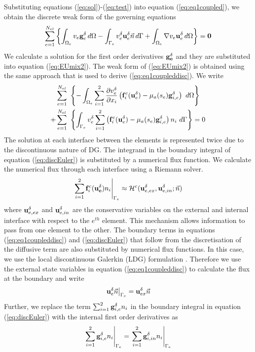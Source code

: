 \documentclass[review]{elsarticle}
\begin{document}
Substituting equations (\ref{eq:sol})-(\ref{eq:test}) into equation (\ref{eq:eq1coupled}), we obtain the discrete weak form of the governing equations
\begin{equation}\label{eq:eq1coupleddisc}
\sum_{e=1}^{N_{el}}\left\{\int_{\Omega_e}{v}_e {{{\bf g}}}^\delta_e \, d\Omega-\int_{\Gamma_e}{v}^\delta_e{\bf u}^\delta_e  \vec{n}\, d\Gamma + \int_{\Omega_e} \nabla {v}_e {\bf u}^\delta_e \, d\Omega\right\}= \bf 0
\end{equation}
We calculate a solution for the first order derivatives $\bf g_e^\delta$ and they are substituted into equation (\ref{eq:EUmix2}). The weak form of (\ref{eq:EUmix2}) is obtained using the same approach that is used to derive (\ref{eq:eq1coupleddisc}). We write
\begin{eqnarray}\label{eq:discEuler}
&\sum_{e=1}^{N_{el}}\ \left\{- \int_{\Omega_e}\sum_{i=1}^{2} \frac{\partial v_e^\delta}{\partial x_i} \left({\bf f}^c_i({\bf u}^\delta_e)-\mu_a(s_e){\bf g}_{i,e}^\delta\right)\ d{\Omega}\right\}\\ \nonumber
+&\sum_{e=1}^{N_{el}}\ \left\{ \int_{\Gamma_e} v_e^\delta\sum_{i=1}^2\left( {\bf f}^c_i({\bf u}^\delta_e)-\mu_a(s_e){\bf g}_{i,e}^\delta\right)n_i\ d\Gamma\right\}  = 0
\end{eqnarray}
The solution at each interface between the elements is represented twice due to the discontinuous nature of DG. The integrand in the boundary integral of equation (\ref{eq:discEuler}) is substituted by a numerical flux function. We calculate the numerical flux through each interface using a Riemann solver.
\begin{equation}\label{eq:RiemannGov}
\left .\sum_{i=1}^2{\bf f}^c_i({\bf u_e^\delta}) n_i\right |_{\Gamma_e} \approx \mathcal{H}^c({{\bf u}^\delta_{e,ex}},{{\bf u}^\delta_{e,in}};\vec{n})
\end{equation}
where ${\bf u}^\delta_{e,ex}$ and ${\bf u}^\delta_{e,in}$ are the conservative variables on the external and internal interface with respect to the $e^{th}$ element. This mechanism allows information to pass from one element to the other.
The boundary terms in equations (\ref{eq:eq1coupleddisc}) and (\ref{eq:discEuler}) that follow from the discretisation of the diffusive term are also substituted by numerical flux functions. In this case, we use the local discontinuous Galerkin (LDG) formulation \cite{CockburnShu1997}.
Therefore we use the external state variables in equation (\ref{eq:eq1coupleddisc}) to calculate the flux at the boundary and 
write
\begin{eqnarray}\label{eq:viscflux1}
\left . {\bf u}^\delta_e \vec{n} \right |_{\Gamma_e} = {\bf u}^\delta_{ex}\vec{n}
\end{eqnarray}
Further, we replace  the term $\sum_{i=1}^2{\bf g}_{i,e}^\delta n_i$ in the boundary integral in equation (\ref{eq:discEuler}) with the internal first order derivatives as
\begin{eqnarray}\label{eq:viscflux2}
\left .{\sum_{i=1}^2{\bf g}_{i,e}^\delta n_i}\right |_{\Gamma_e} = \left .{\sum_{i=1}^2{\bf g}_{i,in}^\delta n_i}\right |_{\Gamma_e}
\end{eqnarray}
\end{document}

